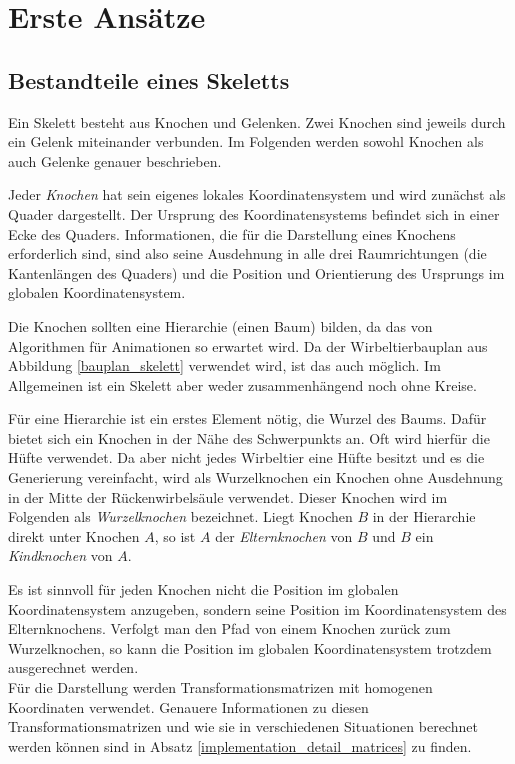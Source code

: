 \chapter{Erste Ansätze}

\section{Bestandteile eines Skeletts}

Ein Skelett besteht aus Knochen und Gelenken. Zwei Knochen sind jeweils durch ein Gelenk miteinander verbunden. Im Folgenden werden sowohl Knochen als auch Gelenke genauer beschrieben.

Jeder \emph{Knochen} hat sein eigenes lokales Koordinatensystem und wird zunächst als Quader dargestellt. Der Ursprung des Koordinatensystems befindet sich in einer Ecke des Quaders.
Informationen, die für die Darstellung eines Knochens erforderlich sind, sind also
seine Ausdehnung in alle drei Raumrichtungen (die Kantenlängen des Quaders) und die Position und Orientierung des Ursprungs im globalen Koordinatensystem.

Die Knochen sollten eine Hierarchie (einen Baum) bilden, da das von Algorithmen für Animationen so erwartet wird.  Da der Wirbeltierbauplan aus Abbildung \ref{bauplan_skelett} verwendet wird, ist das auch möglich. Im Allgemeinen ist ein Skelett aber weder zusammenhängend noch ohne Kreise.

Für eine Hierarchie ist ein erstes Element nötig, die Wurzel des Baums.
Dafür bietet sich ein Knochen in der Nähe des Schwerpunkts an. Oft wird hierfür die Hüfte verwendet. 
Da aber nicht jedes Wirbeltier eine Hüfte besitzt und es die Generierung vereinfacht, wird als Wurzelknochen ein Knochen ohne Ausdehnung in der Mitte der Rückenwirbelsäule verwendet. Dieser Knochen wird im Folgenden als \emph{Wurzelknochen} bezeichnet. Liegt Knochen $B$ in der Hierarchie direkt unter Knochen $A$, so ist $A$ der \emph{Elternknochen} von $B$ und $B$ ein \emph{Kindknochen} von $A$.

Es ist sinnvoll für jeden Knochen nicht die Position im globalen Koordinatensystem anzugeben, sondern seine Position im Koordinatensystem des Elternknochens. Verfolgt man den Pfad von einem Knochen zurück zum Wurzelknochen, so kann die Position im globalen Koordinatensystem trotzdem ausgerechnet werden.  \\
Für die Darstellung werden Transformationsmatrizen mit homogenen Koordinaten verwendet. Genauere Informationen zu diesen Transformationsmatrizen und wie sie in verschiedenen Situationen berechnet werden können sind in Absatz \ref{implementation_detail_matrices} zu finden.


